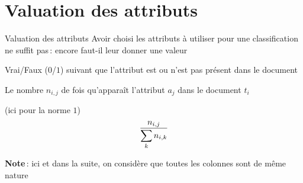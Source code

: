 \documentclass[../allslides.tex]{subfiles}
\begin{document}
\section{Valuation des attributs}
\begin{frame}[label=attrval]{Valuation des attributs}
	Avoir choisi les attributs à utiliser pour une classification ne suffit pas : encore faut-il leur donner une \alert{valeur}
	\pause
	\begin{description}[*]
		\item<+->[Booléenne] Vrai/Faux ($0$/$1$) suivant que l'attribut est ou n'est pas présent dans le document
		\item<+->[Occurrences] Le nombre $n_{i,j}$ de fois qu'apparaît l'attribut $a_j$ dans le document $t_i$
		\item<+->[Fréquences normalisées par ligne] (ici pour la norme $1$)
			\begin{equation}
				\frac{\mathnode{freqfracnum}{n_{i,j}}}{\mathnode{freqfracden}{\sum_k n_{i,k}}}
			\end{equation}
	\end{description}
	\pause
	\textbf{Note} : ici et dans la suite, on considère que toutes les colonnes sont de même nature
\end{frame}
\end{document}
